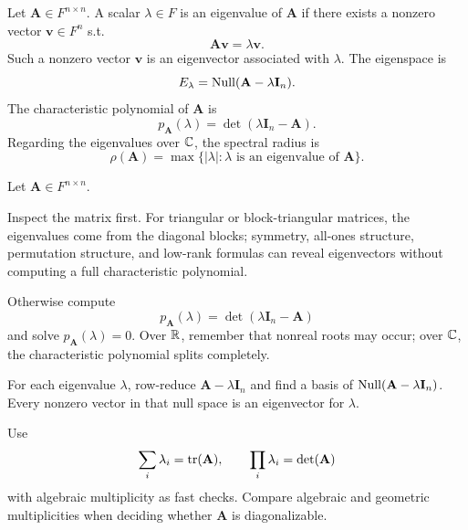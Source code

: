     \begin{definition}
        Let $\mathbf{A}\in F^{n\times n}$. A scalar $\lambda\in F$ is an
        eigenvalue of $\mathbf{A}$ if there exists a nonzero vector
        $\mathbf{v}\in F^n$ s.t.
        \[
            \mathbf{A}\mathbf{v}=\lambda\mathbf{v}.
        \]
        Such a nonzero vector $\mathbf{v}$ is an eigenvector associated with
        $\lambda$. The eigenspace is
        \[
            E_\lambda
            =
            \operatorname{Null}(\mathbf{A}-\lambda\mathbf{I}_n).
        \]
        The characteristic polynomial of $\mathbf{A}$ is
        \[
            p_{\mathbf{A}}(\lambda)
            =
            \det(\lambda\mathbf{I}_n-\mathbf{A}).
        \]
        Regarding the eigenvalues over $\mathbb{C}$, the spectral radius is
        \[
            \rho(\mathbf{A})
            =
            \max\{\lvert\lambda\rvert:\lambda\text{ is an eigenvalue of }\mathbf{A}\}.
        \]
    \end{definition}


    \begin{algorithm}
        Let $\mathbf{A}\in F^{n\times n}$.
        \begin{bookitems}
            \item Inspect the matrix first. For triangular or block-triangular
                  matrices, the eigenvalues come from the diagonal blocks;
                  symmetry, all-ones structure, permutation structure, and
                  low-rank formulas can reveal eigenvectors without computing a
                  full characteristic polynomial.
            \item Otherwise compute
                  \[
                      p_{\mathbf{A}}(\lambda)
                      =\det(\lambda\mathbf{I}_n-\mathbf{A})
                  \]
                  and solve $p_{\mathbf{A}}(\lambda)=0$. Over $\mathbb{R}$, remember
                  that nonreal roots may occur; over $\mathbb{C}$, the characteristic
                  polynomial splits completely.
            \item For each eigenvalue $\lambda$, row-reduce
                  $\mathbf{A}-\lambda\mathbf{I}_n$ and find a basis of
                  $\operatorname{Null}(\mathbf{A}-\lambda\mathbf{I}_n)$. Every nonzero vector
                  in that null space is an eigenvector for $\lambda$.
            \item Use
                  \[
                      \sum_i\lambda_i=\operatorname{tr}(\mathbf{A}),
                      \qquad
                      \prod_i\lambda_i=\det(\mathbf{A})
                  \]
                  with algebraic multiplicity as fast checks. Compare algebraic
                  and geometric multiplicities when deciding whether
                  $\mathbf{A}$ is diagonalizable.
        \end{bookitems}
    \end{algorithm}

